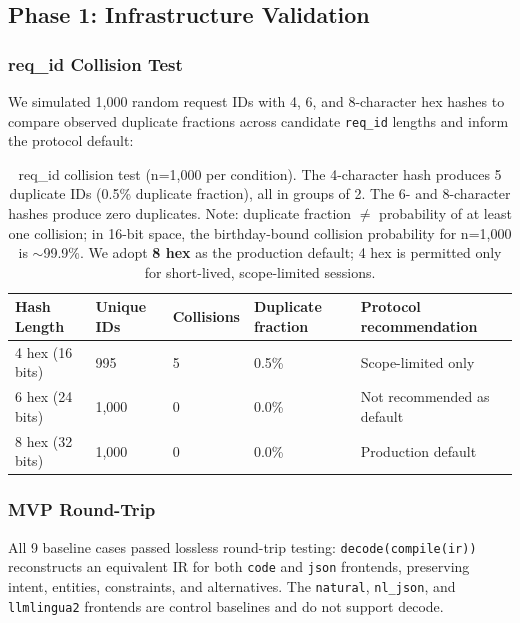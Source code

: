 \documentclass{article}
\begin{document}
\subsection{Phase 1: Infrastructure Validation}\label{phase-1-infrastructure-validation}



\subsubsection{req\_id Collision Test}\label{req_id-collision-test}



We simulated 1,000 random request IDs with 4, 6, and 8-character hex hashes to compare observed duplicate fractions across candidate \texttt{req\_id} lengths and inform the protocol default:



\begin{table}[ht]
\centering
\small
\caption{req\_id collision test (n=1,000 per condition). The 4-character hash produces 5 duplicate IDs (0.5\% duplicate fraction), all in groups of 2. The 6- and 8-character hashes produce zero duplicates. Note: duplicate fraction $\neq$ probability of at least one collision; in 16-bit space, the birthday-bound collision probability for n=1,000 is $\sim$99.9\%. We adopt \textbf{8 hex} as the production default; 4 hex is permitted only for short-lived, scope-limited sessions.}
\begin{tabular}{lllll}
\toprule
Hash Length & Unique IDs & Collisions & Duplicate fraction & Protocol recommendation \\
\midrule
4 hex (16 bits) & 995 & 5 & 0.5\% & Scope-limited only \\
6 hex (24 bits) & 1,000 & 0 & 0.0\% & Not recommended as default \\
8 hex (32 bits) & 1,000 & 0 & 0.0\% & Production default \\
\bottomrule
\end{tabular}
\end{table}


\subsubsection{MVP Round-Trip}\label{mvp-round-trip}



All 9 baseline cases passed lossless round-trip testing: \texttt{decode(compile(ir))} reconstructs an equivalent IR for both \texttt{code} and \texttt{json} frontends, preserving intent, entities, constraints, and alternatives. The \texttt{natural}, \texttt{nl\_json}, and \texttt{llmlingua2} frontends are control baselines and do not support decode.
\end{document}
